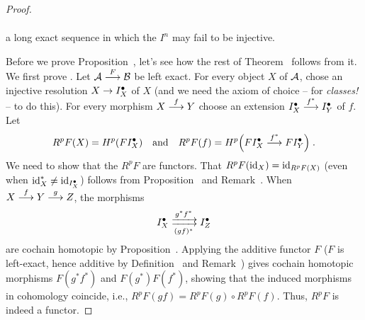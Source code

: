 \documentclass[a4paper,parskip=half,numbers=enddot, DIV=12]{scrreprt}
\begin{document}
\begin{proof}
\begin{rem}
\begin{alphanumerate}
\begin{align*}
				\end{align*}
				a long exact sequence in which the $I^n$ may fail to be injective. 
			\end{alphanumerate}
		\end{rem}
		Before we prove Proposition~, let's see how the rest of Theorem~ follows from it. We first prove . Let $\Aa\morphism[F]\Bb$ be left exact. For every object $X$ of $\mathcal{A}$, chose an injective resolution $X\morphism I_X^\bullet $ of $X$ (and we need the axiom of choice -- for \emph{classes!} -- to do this). For every morphism $X\morphism[f]Y$ choose an extension $I_X^\bullet \morphism[f^* ]I_Y^\bullet $ of $f$. Let
		\begin{align*}
			R^pF(X)=H^p(FI_X^\bullet )\quad\text{and}\quad R^pF(f)=H^p\Big(FI_X^\bullet \morphism[f^* ]FI_Y^\bullet \Big)\;.
		\end{align*}
		We need to show that the $R^pF$ are functors. That $R^pF(\operatorname{id}_X)=\operatorname{id}_{R^pF(X)}$ (even when $\operatorname{id}_X^* \neq \operatorname{id}_{I_X^\bullet }$) follows from Proposition~ and Remark~. When $X\morphism[f]Y\morphism[g]Z$, the morphisms 
		\begin{align*}
			I_X^\bullet \xdoublemorphism[g^* f^* ][(gf)^* ]I_Z^\bullet 
		\end{align*}
		are cochain homotopic by Proposition~. Applying the additive functor $F$ ($F$ is left-exact, hence additive by Definition~ and Remark~) gives cochain homotopic morphisms $F(g^* f^* )$ and $F(g^* )F(f^*)$, showing that the induced morphisms in cohomology coincide, i.e., $R^pF(gf)=R^pF(g)\circ R^pF(f)$. Thus, $R^pF$ is indeed a functor.
		

\end{proof}
\end{document}
